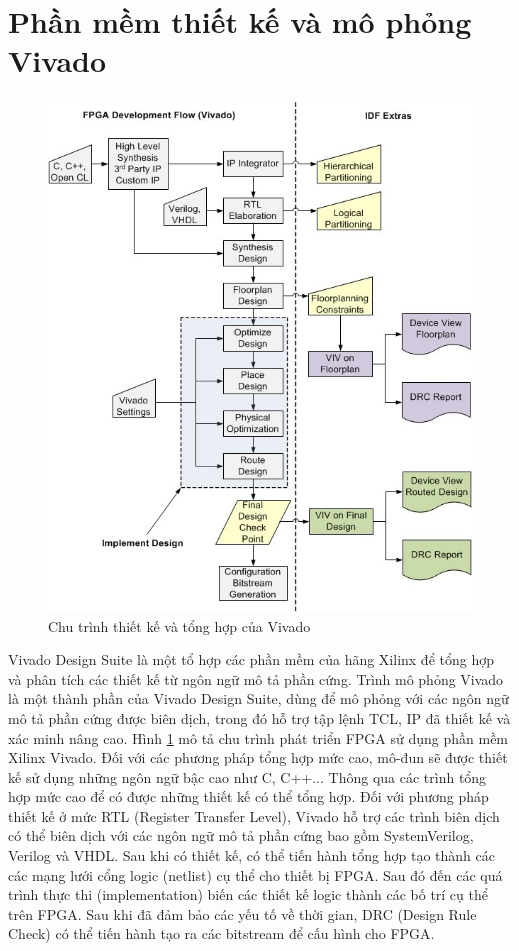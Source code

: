 \section{Phần mềm thiết kế và mô phỏng Vivado}
\begin{figure}[!ht]
	\centering
	\includegraphics[width=\linewidth]{figures/3311000-fpga-development-flow.jpg}
	\caption{Chu trình thiết kế và tổng hợp của Vivado}
	\label{fig:fpga_dev}
\end{figure}


Vivado Design Suite là một tổ hợp các phần mềm của hãng Xilinx để tổng hợp và phân tích các thiết kế từ ngôn ngữ mô tả phần cứng. Trình mô phỏng Vivado là một thành phần của Vivado Design Suite, dùng để mô phỏng với các ngôn ngữ mô tả phần cứng được biên dịch, trong đó hỗ trợ tập lệnh TCL, IP đã thiết kế và xác minh nâng cao. Hình \ref{fig:fpga_dev} mô tả chu trình phát triển FPGA sử dụng phần mềm Xilinx Vivado. Đối với các phương pháp tổng hợp mức cao, mô-đun sẽ được thiết kế sử dụng những ngôn ngữ bậc cao như C, C++... Thông qua các trình tổng hợp mức cao để có được những thiết kế có thể tổng hợp. Đối với phương pháp thiết kế ở mức RTL (Register Transfer Level), Vivado hỗ trợ các trình biên dịch có thể biên dịch với các ngôn ngữ mô tả phần cứng bao gồm SystemVerilog, Verilog và VHDL. Sau khi có thiết kế, có thể tiến hành tổng hợp tạo thành các các mạng lưới cổng logic (netlist) cụ thể cho thiết bị FPGA. Sau đó đến các quá trình thực thi (implementation) biến các thiết kế logic thành các bố trí cụ thể trên FPGA. Sau khi đã đảm bảo các yếu tố về thời gian, DRC (Design Rule Check) có thể tiến hành tạo ra các bitstream để cấu hình cho FPGA.
